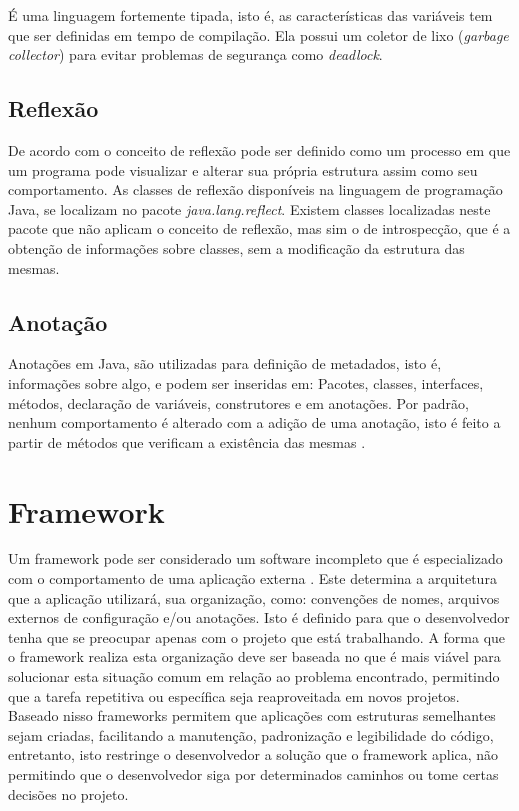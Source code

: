 \par É uma linguagem fortemente tipada, isto é, as características das variáveis tem que ser definidas em tempo de compilação. Ela possui um coletor de lixo (\textit{garbage collector}) para evitar problemas de segurança como \textit{deadlock}. \cite{joy2000java}

\subsection{Reflexão}

\par De acordo com  o conceito de reflexão pode ser definido como um processo em que um programa pode visualizar e alterar sua própria estrutura assim como seu comportamento. As classes de reflexão disponíveis na linguagem de programação Java, se localizam no pacote \textit{java.lang.reflect}. Existem classes localizadas neste pacote que não aplicam o conceito de reflexão, mas sim o de introspecção, que é a obtenção de informações sobre classes, sem a modificação da estrutura das mesmas.

\subsection{Anotação}

\par Anotações em Java, são utilizadas para definição de metadados, isto é, informações sobre algo, e podem ser inseridas em: Pacotes, classes, interfaces, métodos, declaração de variáveis, construtores e em anotações. Por padrão, nenhum comportamento é alterado com a adição de uma anotação, isto é feito a partir de métodos que verificam a existência das mesmas \cite{bloch2004jsr}.

\section{Framework}

\par Um framework pode ser considerado um software incompleto que é especializado com o comportamento de uma aplicação externa \cite{johnson1988designing}. Este determina a arquitetura que a aplicação utilizará, sua organização, como: convenções de nomes, arquivos externos de configuração e/ou anotações. Isto é definido para que o desenvolvedor tenha que se preocupar apenas com o projeto que está trabalhando. A forma que o framework realiza esta organização deve ser baseada no que é mais viável para solucionar esta situação comum em relação ao problema encontrado, permitindo que a tarefa repetitiva ou específica seja reaproveitada em novos projetos.
Baseado nisso frameworks permitem que aplicações com estruturas semelhantes sejam criadas, facilitando a manutenção, padronização e legibilidade do código, entretanto, isto restringe o desenvolvedor a solução que o framework aplica, não permitindo que o desenvolvedor siga por determinados caminhos ou tome certas decisões no projeto.\cite{gamma2009padroes}

